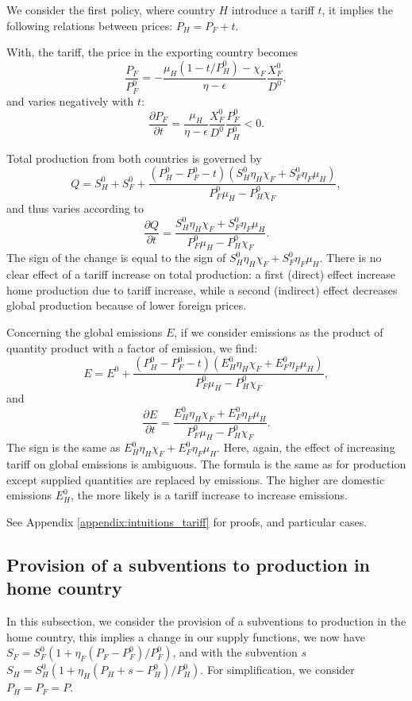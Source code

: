 We consider the first policy, where country $H$ introduce a tariff $t$, it implies the following relations between prices: $P_H = P_F + t$.

With, the tariff, the price in the exporting country becomes
$$
\frac{P_F}{P_F^0}= -\frac{\mu_H (1 - t/P_H^0) - \chi_F}{\eta-\epsilon}\frac{X_F^0}{D^0},
$$
and varies negatively with $t$: 
$$
\frac{\partial P_F}{\partial t} = \frac{\mu_H}{\eta - \epsilon}  \frac{X_F^0}{D^0} \frac{P_F^0}{P_H^0}<0.
$$

Total production from both countries is governed by 
$$
Q = S_H^0 + S_F^0 + \frac{(P_H^0 - P_F^0 - t)(S_H^0 \eta_H \chi_F + S_F^0 \eta_F \mu_H)}{P_F^0 \mu_H - P_H^0 \chi_F},
$$
and thus varies according to 
$$
\frac{\partial Q}{\partial t} = \frac{S_H^0 \eta_H \chi_F + S_F^0 \eta_F \mu_H}{P_F^0 \mu_H - P_H^0 \chi_F}.
$$
The sign of the change is equal to the sign of $S_H^0 \eta_H \chi_F + S_F^0 \eta_F \mu_H$. There is no clear effect of a tariff increase on total production: a first (direct) effect increase home production due to tariff increase, while a second (indirect) effect decreases global production because of lower foreign prices. 

Concerning the global emissions $E$, if we consider emissions as the product of quantity product with a factor of emission, we find:
$$
E = E^0 + \frac{(P_H^0 - P_F^0 - t)(E_H^0 \eta_H \chi_F + E_F^0\eta_F\mu_H)}{P_F^0\mu_H - P_H^0\chi_F},
$$ and $$
\frac{\partial E}{\partial t} = \frac{E_H^0 \eta_H \chi_F + E_F^0 \eta_F \mu_H}{P_F^0 \mu_H - P_H^0 \chi_F}.
$$
The sign is the same as $E_H^0 \eta_H \chi_F + E_F^0 \eta_F \mu_H$. Here, again, the effect of increasing tariff on global emissions is ambiguous. The formula is the same as for production except supplied quantities are replaced by emissions. The higher are domestic emissions $E_H^0$, the more likely is a tariff increase to increase emissions.

See Appendix \ref{appendix:intuitions_tariff} for proofs, and particular cases.


\subsection{Provision of a subventions to production in home country}\label{Sec_subvention}

In this subsection, we consider the provision of a subventions to production in the home country, this implies a change in our supply functions, we now have $S_F=S_F^0 \left( 1+\eta_F \left( P_F-P^0_F \right)/P_F^0 \right)$, and with the subvention $s$ $S_H=S_H^0 \left( 1+\eta_H \left( P_H + s - P^0_H \right)/P_H^0 \right)$. For simplification, we consider $P_H = P_F = P$.


